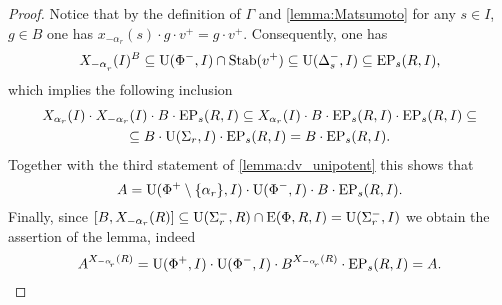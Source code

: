 \begin{proof}
Notice that by the definition of $\Gamma$ and \cref{lemma:Matsumoto} for any $s\in I$, $ g\in B$ one has $x_{-\alpha_r}(s) \cdot g \cdot v^+ = g \cdot v^+$.
Consequently, one has
\[ X_{-\alpha\ssub{r}}(I)^{B} \subseteq \U(\Phi^-, I) \cap \Stab(v^+) \subseteq \U(\Delta_s^-, I) \subseteq \EP_s(R, I), \]
which implies the following inclusion
\begin{multline*}
X_{\alpha_r}(I) \cdot X_{-\alpha_r}(I) \cdot B \cdot \operatorname{EP}_s(R, I) \subseteq 
X_{\alpha_r}(I) \cdot B \cdot \operatorname{EP}_s(R, I) \cdot \operatorname{EP}_s(R, I) \subseteq \\
\subseteq B \cdot \operatorname{U}(\Sigma_r, I) \cdot \operatorname{EP}_s(R, I) =
B \cdot \operatorname{EP}_s(R, I).
\end{multline*}
Together with the third statement of \cref{lemma:dv_unipotent} this shows that
\begin{equation*} \label{rel:sred}
A = \operatorname{U}(\Phi^+\setminus\{\alpha_r\}, I) \cdot \operatorname{U}(\Phi^-, I) \cdot B \cdot \operatorname{EP}_s(R, I).
\end{equation*}
Finally, since $[B, X_{-\alpha_r}(R)] \subseteq \operatorname{U}(\Sigma_r^-, R) \cap \operatorname{E}(\Phi, R, I) = \operatorname{U}(\Sigma_r^-, I)$ we obtain the assertion of the lemma, indeed
\begin{equation*} \label{rel:ninv} A^{X_{-\alpha\ssub{r}}(R)} = \U(\Phi^+, I) \cdot \U(\Phi^-, I) \cdot B ^{X_{-\alpha\ssub{r}}(R)} \cdot \EP_s(R, I) = A. \qedhere \end{equation*}
\end{proof}

